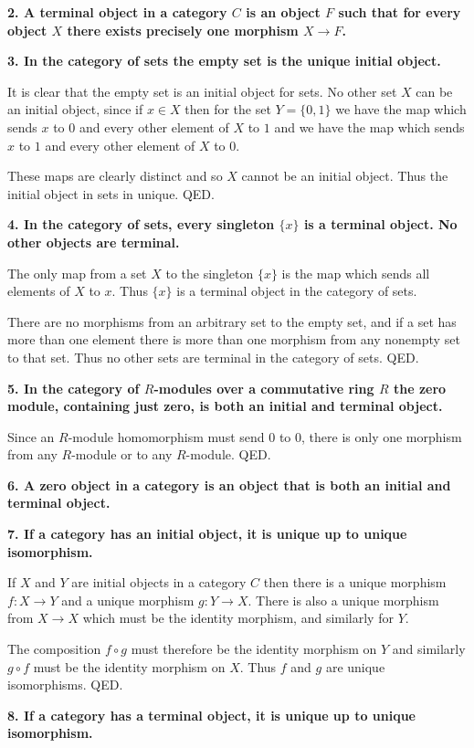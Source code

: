 \documentclass[12pt]{article}
\begin{document}
\textbf{2. A terminal object in a category $C$ is an object $F$ such that for every object $X$ there exists precisely one morphism $X \to F$.}

\textbf{3. In the category of sets the empty set is the unique initial object.}

It is clear that the empty set is an initial object for sets. No other set $X$ can be an initial object, since if $x \in X$ then for the set $Y = \{0, 1\}$ we have the map which sends $x$ to $0$ and every other element of $X$ to $1$ and we have the map which sends $x$ to $1$ and every other element of $X$ to $0$.

These maps are clearly distinct and so $X$ cannot be an initial object. Thus the initial object in sets in unique. QED.

\textbf{4. In the category of sets, every singleton $\{x\}$ is a terminal object. No other objects are terminal.}

The only map from a set $X$ to the singleton $\{x\}$ is the map which sends all elements of $X$ to $x$. Thus $\{x\}$ is a terminal object in the category of sets.

There are no morphisms from an arbitrary set to the empty set, and if a set has more than one element there is more than one morphism from any nonempty set to that set. Thus no other sets are terminal in the category of sets. QED.

\textbf{5. In the category of $R$-modules over a commutative ring $R$ the zero module, containing just zero, is both an initial and terminal object.}

Since an $R$-module homomorphism must send $0$ to $0$, there is only one morphism from any $R$-module or to any $R$-module. QED.

\textbf{6. A zero object in a category is an object that is both an initial and terminal object.}

\textbf{7. If a category has an initial object, it is unique up to unique isomorphism.}

If $X$ and $Y$ are initial objects in a category $C$ then there is a unique morphism $f : X \to Y$ and a unique morphism $g : Y \to X$. There is also a unique morphism from $X \to X$ which must be the identity morphism, and similarly for $Y$.

The composition $f\circ g$ must therefore be the identity morphism on $Y$ and similarly $g\circ f$ must be the identity morphism on $X$. Thus $f$ and $g$ are unique isomorphisms. QED.

\textbf{8. If a category has a terminal object, it is unique up to unique isomorphism.}
\end{document}
